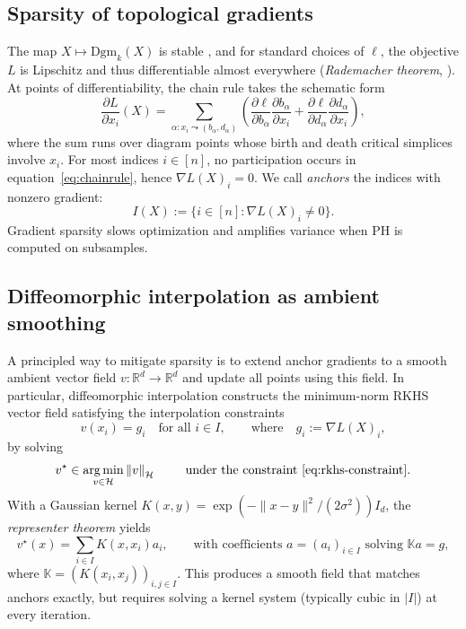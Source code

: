 \documentclass{article} %
\def\eqref#1{equation~\ref{#1}}
\newcommand{\R}{\mathbb{R}}
\newcommand{\Dgm}{\mathrm{Dgm}}
\newcommand*{\norm}[1]{\left\|#1\right\|}
\theoremstyle{plain}
\theoremstyle{definition}
\theoremstyle{remark}
\begin{document}
\subsection{Sparsity of topological gradients}
The map $X \mapsto \Dgm_k(X)$ is stable \citep{cohensteiner2007stability, stability2, Skraba2020WassersteinSF}, and for standard choices of $\ell$, the objective $L$ is Lipschitz and thus
differentiable almost everywhere (\emph{Rademacher theorem}, \citet{MORGAN201625}). At points of differentiability, the chain rule takes the schematic form
\begin{equation}
\label{eq:chainrule}
  \frac{\partial L}{\partial x_i}(X) = \sum_{ \alpha : x_i \leadsto (b_\alpha, d_\alpha)} \left( \frac{\partial \ell}{\partial b_\alpha} \frac{\partial b_\alpha}{\partial x_i} + \frac{\partial \ell}{\partial d_\alpha} \frac{\partial d_\alpha}{\partial x_i} \right),
\end{equation}
where the sum runs over diagram points whose birth and death critical simplices involve $x_i$. For most indices $i \in [n]$, no participation occurs in \eqref{eq:chainrule}, hence $\nabla L(X)_i=0$.
We call \emph{anchors} the indices with nonzero gradient:
    \[ I(X) := \{ i \in [n] : \nabla L(X)_i \neq 0 \}.\]
Gradient sparsity slows optimization and amplifies variance when PH is computed on subsamples.

\subsection{Diffeomorphic interpolation as ambient smoothing}
A principled way to mitigate sparsity is to extend anchor gradients to a smooth ambient vector field $v : \R^d \to \R^d$ and update all points using this field. In particular, diffeomorphic interpolation constructs the minimum-norm RKHS vector field satisfying the interpolation constraints
\begin{equation} \label{eq:rkhs-constraint}
  v(x_i) = g_i \quad \text{for all } i \in I, \qquad \text{where} \quad g_i := \nabla L(X)_i,
\end{equation}
by solving
\begin{equation}
\label{eq:rkhs-minnorm}
  v^\star \in \mathop{\arg \min}_{v \in \mathcal{H}} \norm{v}_{\mathcal{H}} \quad  \quad \text{ under the constraint } \ref{eq:rkhs-constraint}.
\end{equation}
With a Gaussian kernel $K(x, y) = \exp(- \|x-y\|^2 / (2 \sigma^2)) I_d$, the \emph{representer theorem} yields
    \[ v^\star(x) = \sum_{i \in I} K(x,x_i) a_i, \qquad
  \text{with coefficients } a = (a_i)_{i \in I} \text{ solving } \mathbb{K} a = g, \]
where $\mathbb{K} = (K(x_i, x_j))_{i, j \in I}$. This produces a smooth field that matches anchors exactly, but requires solving a kernel system (typically cubic in $|I|$) at every iteration.
\end{document}
